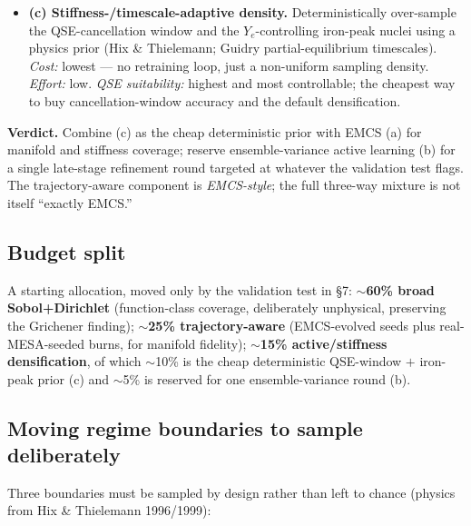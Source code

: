 \documentclass[11pt]{article}
\begin{document}
\begin{itemize}
\item \textbf{(c) Stiffness-/timescale-adaptive density.} Deterministically over-sample the QSE-cancellation window and the $Y_e$-controlling iron-peak nuclei using a physics prior (Hix \& Thielemann; Guidry partial-equilibrium timescales). \emph{Cost:} lowest --- no retraining loop, just a non-uniform sampling density. \emph{Effort:} low. \emph{QSE suitability:} highest and most controllable; the cheapest way to buy cancellation-window accuracy and the default densification.
\end{itemize}

\textbf{Verdict.} Combine (c) as the cheap deterministic prior with EMCS (a) for manifold and stiffness coverage; reserve ensemble-variance active learning (b) for a single late-stage refinement round targeted at whatever the validation test flags. The trajectory-aware component is \emph{EMCS-style}; the full three-way mixture is not itself ``exactly EMCS.''

\subsection{Budget split}

A starting allocation, moved only by the validation test in \S7: \textbf{$\sim$60\% broad Sobol+Dirichlet} (function-class coverage, deliberately unphysical, preserving the Grichener finding); \textbf{$\sim$25\% trajectory-aware} (EMCS-evolved seeds plus real-MESA-seeded burns, for manifold fidelity); \textbf{$\sim$15\% active/stiffness densification}, of which $\sim$10\% is the cheap deterministic QSE-window $+$ iron-peak prior (c) and $\sim$5\% is reserved for one ensemble-variance round (b).

\subsection{Moving regime boundaries to sample deliberately}

Three boundaries must be sampled by design rather than left to chance (physics from Hix \& Thielemann 1996/1999):
\end{document}
